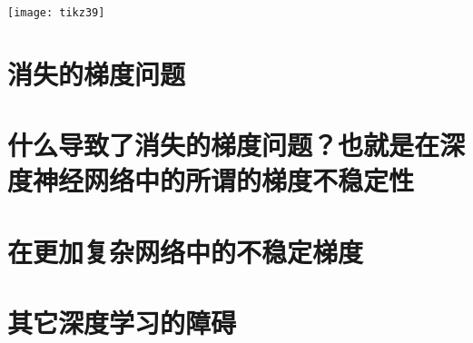 \begin{center}
  \texttt{[image: tikz39]}
\end{center}

\section{消失的梯度问题}
\label{sec:the_vanishing_gradient_problem}

\section{什么导致了消失的梯度问题？也就是在深度神经网络中的所谓的梯度不稳定性}

\section{在更加复杂网络中的不稳定梯度}

\section{其它深度学习的障碍}
